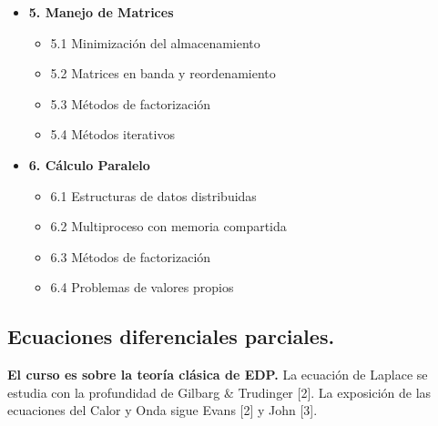 \documentclass[10pt,a4paper]{article}
\begin{document}
\begin{itemize}
    \item \textbf{5. Manejo de Matrices}
    \begin{itemize}
        \item 5.1 Minimización del almacenamiento
        \item 5.2 Matrices en banda y reordenamiento
        \item 5.3 Métodos de factorización
        \item 5.4 Métodos iterativos
    \end{itemize}

    \item \textbf{6. Cálculo Paralelo}
    \begin{itemize}
        \item 6.1 Estructuras de datos distribuidas
        \item 6.2 Multiproceso con memoria compartida
        \item 6.3 Métodos de factorización
        \item 6.4 Problemas de valores propios
    \end{itemize}
\end{itemize}
\newpage
\subsection{Ecuaciones diferenciales parciales.}

\textbf{El curso es sobre la teoría clásica de EDP.} La ecuación de Laplace se estudia con la profundidad de Gilbarg \& Trudinger [2]. La exposición de las ecuaciones del Calor y Onda sigue Evans [2] y John [3].
\end{document}
